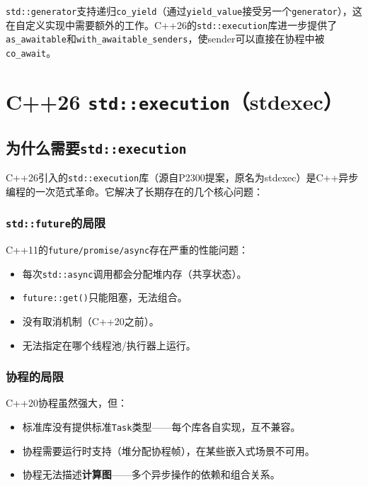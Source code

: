 \documentclass[12pt,a4paper,fontset=fandol]{ctexbook}
\newcommand{\cpp}[1]{C++#1}
\begin{document}
\begin{note}
\texttt{std::generator}支持递归\texttt{co\_yield}（通过\texttt{yield\_value}接受另一个\texttt{generator}），这在自定义实现中需要额外的工作。\cpp{}26的\texttt{std::execution}库进一步提供了\texttt{as\_awaitable}和\texttt{with\_awaitable\_senders}，使sender可以直接在协程中被\texttt{co\_await}。
\end{note}

\part{\cpp{}26 \texttt{std::execution}（stdexec）}

\chapter{为什么需要\texttt{std::execution}}

\cpp{}26引入的\texttt{std::execution}库（源自P2300提案，原名为stdexec）是\cpp{}异步编程的一次范式革命。它解决了长期存在的几个核心问题：

\section{\texttt{std::future}的局限}

\cpp{}11的\texttt{future/promise/async}存在严重的性能问题：
\begin{itemize}[nosep]
\item 每次\texttt{std::async}调用都会分配堆内存（共享状态）。
\item \texttt{future::get()}只能阻塞，无法组合。
\item 没有取消机制（\cpp{}20之前）。
\item 无法指定在哪个线程池/执行器上运行。
\end{itemize}

\section{协程的局限}

\cpp{}20协程虽然强大，但：
\begin{itemize}[nosep]
\item 标准库没有提供标准\texttt{Task}类型——每个库各自实现，互不兼容。
\item 协程需要运行时支持（堆分配协程帧），在某些嵌入式场景不可用。
\item 协程无法描述\textbf{计算图}——多个异步操作的依赖和组合关系。
\end{itemize}
\end{document}
